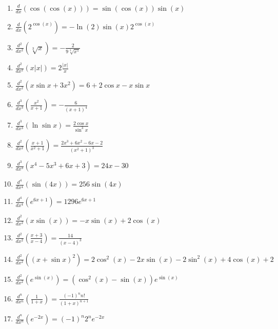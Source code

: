 \documentclass[11pt,a4paper]{article}
\begin{document}
\begin{enumerate}
\item $\displaystyle \frac{d}{dx}\left( \cos(\cos(x)) \right) = \sin(\cos(x))\sin(x)$
\item $\displaystyle \frac{d}{dx}\left( 2^{\cos(x)} \right) = -\ln(2)\sin(x)2^{\cos(x)}$
\item $\displaystyle \frac{d^{2}}{dx^{2}}\left( \sqrt[3]{x} \right) = -\frac{2}{9\sqrt[3]{x^{5}}}$
\item $\displaystyle \frac{d^{2}}{dx^{2}}\left( x|x| \right) = 2\frac{|x|}{x}$
\item $\displaystyle \frac{d^{2}}{dx^{2}}\left( x\sin x + 3x^{2} \right) = 6 + 2\cos x - x\sin x$
\item $\displaystyle \frac{d^{3}}{dx^{3}}\left( \frac{x^{2}}{x + 1} \right) = -\frac{6}{(x + 1)^{4}}$
\item $\displaystyle \frac{d^{3}}{dx^{3}}\left( \ln\sin x \right) = \frac{2\cos x}{\sin^{3} x}$
\item $\displaystyle \frac{d^{2}}{dx^{2}}\left( \frac{x + 1}{x^{2} + 1} \right) = \frac{2x^{3} + 6x^{2} - 6x - 2}{(x^{2} + 1)^{3}}$
\item $\displaystyle \frac{d^{3}}{dx^{3}}\left( x^{4} - 5x^{3} + 6x + 3 \right) = 24x - 30$
\item $\displaystyle \frac{d^{4}}{dx^{4}}\left( \sin(4x) \right) = 256\sin(4x)$
\item $\displaystyle \frac{d^{4}}{dx^{4}}\left( e^{6x + 1} \right) = 1296e^{6x + 1}$
\item $\displaystyle \frac{d^{2}}{dx^{2}}\left( x\sin(x) \right) = -x\sin(x) + 2\cos(x)$
\item $\displaystyle \frac{d^{2}}{dx^{2}}\left( \frac{x + 3}{x - 4} \right) = \frac{14}{(x - 4)^{3}}$
\item $\displaystyle \frac{d^{2}}{dx^{2}}\left( (x + \sin x)^{2} \right) = 2\cos^{2}(x) - 2x\sin(x) - 2\sin^{2}(x) + 4\cos(x) + 2$
\item $\displaystyle \frac{d^{2}}{dx^{2}}\left( e^{\sin(x)} \right) = \left(\cos^{2}(x) - \sin(x)\right)e^{\sin(x)}$
\item $\displaystyle \frac{d^{n}}{dx^{n}}\left( \frac{1}{1 + x} \right) = \frac{(-1)^{n} n!}{(1 + x)^{n + 1}}$
\item $\displaystyle \frac{d^{n}}{dx^{n}}\left( e^{-2x} \right) = (-1)^{n} 2^{n} e^{-2x}$
\end{enumerate}
\end{document}
